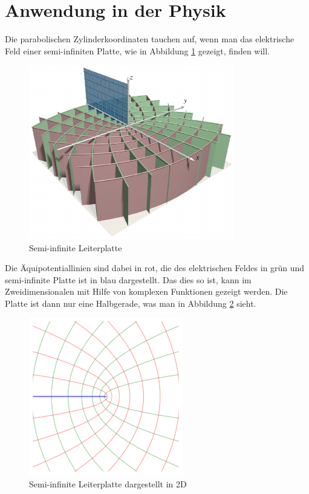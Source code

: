 %
%
%

\section{Anwendung in der Physik 
	\label{parzyl:section:teil2}}

Die parabolischen Zylinderkoordinaten tauchen auf, wenn man das elektrische Feld einer semi-infiniten Platte, wie in Abbildung \ref{parzyl:fig:leiterplatte} gezeigt, finden will.
\begin{figure}
	\centering
	\includegraphics[width=0.8\textwidth]{papers/parzyl/images/halfplane.pdf}
	\caption{Semi-infinite Leiterplatte}
	\label{parzyl:fig:leiterplatte}
\end{figure}
Die Äquipotentiallinien sind dabei in rot, die des elektrischen Feldes in grün und 
semi-infinite Platte ist in blau dargestellt.
Das dies so ist, kann im Zweidimensionalen mit Hilfe von komplexen Funktionen gezeigt werden. Die Platte ist dann nur eine Halbgerade, was man in Abbildung \ref{parzyl:fig:leiterplatte_2d} sieht.
\begin{figure}
	\centering
	\includegraphics[width=0.6\textwidth]{papers/parzyl/img/Plane_2D.png}
	\caption{Semi-infinite Leiterplatte dargestellt in 2D}
	\label{parzyl:fig:leiterplatte_2d}
\end{figure}

